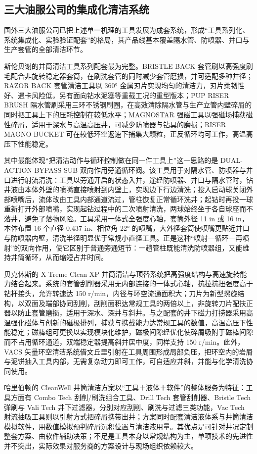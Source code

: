 \subsection{三大油服公司的集成化清洁系统}

国外三大油服公司已把上述单一机理的工具发展为成套系统，形成“工具系列化、系统集成化、实验验证配套”的格局，其产品线基本覆盖隔水管、防喷器、井口与生产套管的全部清洁环节。

斯伦贝谢的井筒清洁工具系列配套最为完整。BRISTLE BACK 套管刷以高强度刷毛配合非旋转稳定器套筒，在刷洗套管的同时减少套管磨损，并可适配多种井径；RAZOR BACK 套管清洁工具以 360° 金属刃片实现均匀的清洁力，刃片柔韧性好、遇卡风险低，另有面向钻水泥塞等重载工况的重型版本；PUP RISER BRUSH 隔水管刷采用三环不锈钢刷圈，在高效清除隔水管与生产立管内壁碎屑的同时把工具上下的压耗控制在较低水平；MAGNOSTAR 强磁工具以强磁场捕获磁性碎屑，适用于深水与高温高压井，可减少防喷器与钻具的磨损；RISER MAGNO BUCKET 可在较低环空返速下捕集大颗粒，正反循环均可工作，高温高压下性能稳定。

其中最能体现“把清洁动作与循环控制做在同一件工具上”这一思路的是 DUAL-ACTION BYPASS SUB 双向作用旁通循环阀。该工具用于对隔水管、防喷器与井口进行射流清洗：工具以旁通开启的状态入井，途经防喷器、井口与隔水管时，钻井液由本体外壁的喷嘴直接喷射到内壁上，实现边下行边清洗；投入启动球关闭外部喷嘴后，流体改由工具内部通道流过，管柱恢复正常循环洗井；起钻时再投一球重新打开外部喷嘴，实现起钻过程中的二次喷射清洗，两球始终坐于各自球座而不落井，避免了落物风险。工具采用一体式全强度心轴，套筒外径 11 in 或 16 in，本体布置 16 个直径 0.437 in、相位角 22° 的喷嘴，大外径套筒使喷嘴更贴近井口与防喷器内壁，清洗半径明显优于常规小直径工具。正是这种“喷射—循环—再喷射”的双向作用，使它区别于普通旁通短节：一趟管柱既能清洗防喷器组，又能维持井筒循环，从而缩短占井时间。

贝克休斯的 X-Treme Clean XP 井筒清洁与顶替系统把高强度结构与高速旋转能力结合起来。系统的套管刮削器采用无内部连接的一体式心轴，抗拉抗扭强度高于钻杆接头，允许转速达 150 r/min，内径与环空流通面积大；刀片为新型螺旋结构，以双面及端部协同刮削，刮削面积达常规工具的两倍以上，非旋转刀片配扶正器以防止套管磨损，适用于深水、深井与斜井。与之配套的井下磁力打捞器采用高温强化磁体与创新的磁极排列，捕获与携载能力达常规工具的数值，高温高压下性能稳定；磁棒组可更换以实现模块化维护，磁极间隙经优化使碎屑吸附于磁棒间隙而不占用循环通道，双端稳定器提高斜井居中度，同样支持 150 r/min。此外，VACS 矢量环空清洁系统借文丘里引射在工具周围形成局部负压，把环空内的岩屑与泥饼抽入工具内部，无需复杂动力即可工作，可自适应井斜，并能与化学清洗协同使用。

哈里伯顿的 CleanWell 井筒清洁方案以“工具＋液体＋软件”的整体服务为特征：工具方面有 Combo Tech 刮削/刷洗组合工具、Drill Tech 套管刮削器、Bristle Tech 弹刷与 Vali Tech 井下过滤器，分别对应刮削、刷洗与过滤三类功能，Vac Tech 射流抽吸工具则以引射方式把碎屑携带出井；方案同时配套清洁液体系与井筒清洁模拟软件，用数值模拟预判碎屑沉积位置与清洁液用量。其优点是可针对井况定制整套方案、由软件辅助决策；不足是工具本身以常规结构为主，单项技术的先进性并不突出，实际效果对服务商的方案设计与现场组织依赖较大。

